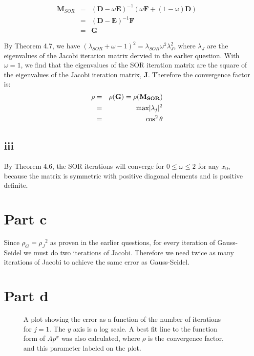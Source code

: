 \documentclass[11pt]{article}
\begin{document}
\begin{eqnarray*}
\mathbf{M}_{SOR} &=& (\mathbf{D} - \omega \mathbf{E})^{-1} (\omega \mathbf{F} + (1-\omega) \mathbf{D}) \\
&=& (\mathbf{D} - \mathbf{E})^{-1} \mathbf{F} \\
&=& \mathbf{G}
\end{eqnarray*}

By Theorem 4.7, we have $(\lambda_{SOR} + \omega - 1)^2 = \lambda_{SOR} \omega^2 \lambda_J^2$, where $\lambda_J$ are the eigenvalues of the Jacobi iteration matrix dervied in the earlier question. With $\omega = 1$, we find that the eigenvalues of the SOR iteration matrix are the square of the eigenvalues of the Jacobi iteration matrix, $\mathbf{J}$. Therefore the convergence factor is:
\begin{eqnarray*}
\rho &=& \rho(\mathbf{G}) = \rho(\mathbf{M_{SOR}}) \\
&=& \textnormal{max} |\lambda_j|^2 \\
&=& \cos^2 \theta
\end{eqnarray*}


\subsection{iii}
By Theorem 4.6, the SOR iterations will converge for $0 \le \omega \le 2$ for any $x_0$, because the matrix is symmetric with positive diagonal elements and is positive definite.

\section{Part c}
Since $\rho_G = {\rho_J}^2$ as proven in the earlier questions, for every iteration of Gauss-Seidel we must do two iterations of Jacobi. Therefore we need twice as many iterations of Jacobi to achieve the same error as Gauss-Seidel.

\section{Part d}

\begin{figure}
\begin{center}

\caption{ A plot showing the error as a function of the number of iterations for $j=1$. The $y$ axis is a log scale. A best fit line to the function form of $A p^x$ was also calculated, where $\rho$ is the convergence factor, and this parameter labeled on the plot.  }
\label{j1}
\end{center}
\end{figure}
\end{document}
